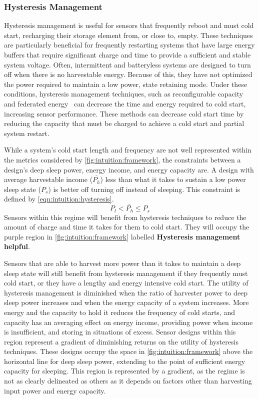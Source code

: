 \subsubsection{Hysteresis Management}
Hysteresis management is useful for sensors that frequently reboot and must cold start, recharging their storage element from, or close to, empty. 
These techniques are particularly beneficial for frequently restarting systems that have large energy buffers that require significant charge and time to provide a sufficient and stable system voltage. 
Often, intermittent and batteryless systems are designed to turn off when there is no harvestable energy. Because of this, they have not optimized the power required to maintain a low power, state retaining mode. 
Under these conditions, hysteresis management techniques,
such as reconfigurable capacity~\cite{colinReconfigurable18} and federated energy~\cite{hesterFlicker17} can decrease the time and energy required to cold start, increasing sensor
performance.
These methods can decrease cold start time
by reducing the capacity that must be charged to achieve a cold start and partial system restart.

While a system's cold start length and frequency are not well represented within the metrics considered by \cref{fig:intuition:framework}, 
the constraints between a design's deep sleep power, energy income, and energy capacity are. 
A design with average harvestable income ($\bar{P_h}$) less than what it takes to sustain a low power sleep state ($P_s$) is better off turning off instead of sleeping. This constraint is defined by \cref{eqn:intuition:hysteresis}. 
\begin{equation}
    \label{eqn:intuition:hysteresis}
    P_l < \bar{P_h} \leq P_s
\end{equation}
Sensors within this regime will benefit from hysteresis techniques to reduce the amount of charge and time it takes for them to cold start. They will occupy the purple region in \cref{fig:intuition:framework} labelled \textbf{Hysteresis management helpful}. 

Sensors that are able to harvest more power than it takes to maintain a deep sleep state will still benefit from hysteresis management if they frequently must cold start, or they have a lengthy and energy intensive cold start.
The utility of hysteresis management is diminished
when the ratio of harvester power to deep sleep power increases and when the energy capacity of a system increases.
More energy and the capacity to hold it reduces the frequency of cold starts, and capacity has an averaging effect on energy income, providing power when income is insufficient, and storing in situations of excess. 
Sensor designs within this region represent a gradient of diminishing returns on the utility of hysteresis techniques.
These designs occupy the space in \cref{fig:intuition:framework} above the horizontal line for deep sleep power, extending to the point of sufficient energy capacity for sleeping.
This region is represented by a gradient, as the regime is not as clearly delineated as others as it depends on factors other than harvesting input power and energy capacity.

